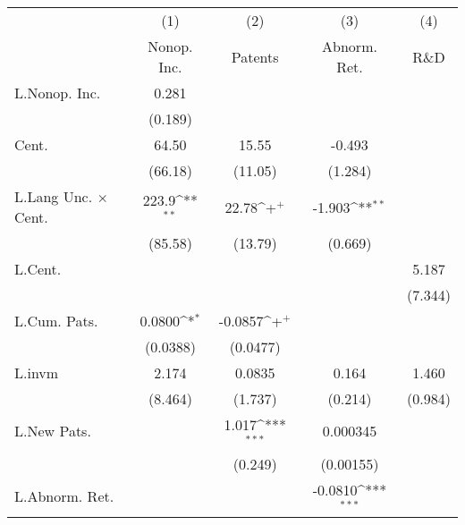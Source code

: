 {
\def\sym#1{\ifmmode^{#1}\else\(^{#1}\)\fi}
\begin{tabular}{l*{4}{c}}
\hline\hline
                    &\multicolumn{1}{c}{(1)}&\multicolumn{1}{c}{(2)}&\multicolumn{1}{c}{(3)}&\multicolumn{1}{c}{(4)}\\
                    &\multicolumn{1}{c}{Nonop. Inc.}&\multicolumn{1}{c}{Patents}&\multicolumn{1}{c}{Abnorm. Ret.}&\multicolumn{1}{c}{R\&D}\\
\hline
L.Nonop. Inc.       &       0.281         &                     &                     &                     \\
                    &     (0.189)         &                     &                     &                     \\
Cent.               &       64.50         &       15.55         &      -0.493         &                     \\
                    &     (66.18)         &     (11.05)         &     (1.284)         &                     \\
L.Lang Unc. $\times$ Cent.&       223.9\sym{**} &       22.78\sym{+}  &      -1.903\sym{**} &                     \\
                    &     (85.58)         &     (13.79)         &     (0.669)         &                     \\
L.Cent.             &                     &                     &                     &       5.187         \\
                    &                     &                     &                     &     (7.344)         \\
L.Cum. Pats.        &      0.0800\sym{*}  &     -0.0857\sym{+}  &                     &                     \\
                    &    (0.0388)         &    (0.0477)         &                     &                     \\
L.invm              &       2.174         &      0.0835         &       0.164         &       1.460         \\
                    &     (8.464)         &     (1.737)         &     (0.214)         &     (0.984)         \\
L.New Pats.         &                     &       1.017\sym{***}&    0.000345         &                     \\
                    &                     &     (0.249)         &   (0.00155)         &                     \\
L.Abnorm. Ret.      &                     &                     &     -0.0810\sym{***}&                     \\

\end{tabular}}
